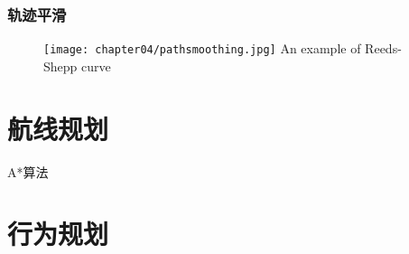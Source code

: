 \subsubsection{轨迹平滑}



\begin{figure}[!htp]
  \centering
  \texttt{[image: chapter04/pathsmoothing.jpg]}
    {An example of Reeds-Shepp curve}
  \label{fig:rscurve}
\end{figure}





\section{航线规划}
\label{sec:routeplanning}

A*算法

\section{行为规划}
\label{sec:behav}
